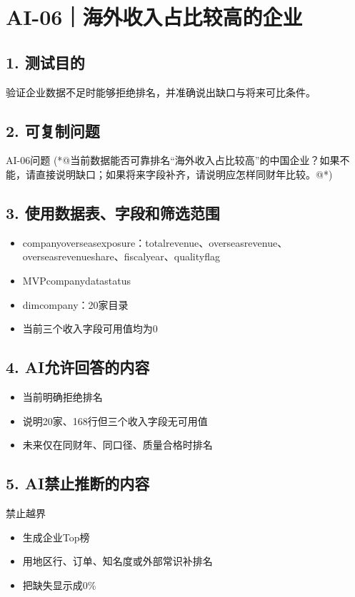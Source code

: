 \documentclass[UTF8,openany,zihao=-4]{ctexbook}
\renewcommand{\_}{\textunderscore\allowbreak}
\begin{document}
\clearpage
\section{AI-06｜海外收入占比较高的企业}
\subsection*{1. 测试目的}
验证企业数据不足时能够拒绝排名，并准确说出缺口与将来可比条件。


\subsection*{2. 可复制问题}
\begin{PromptBox}{AI-06问题}
(*@{\promptcjk 当前数据能否可靠排名“海外收入占比较高”的中国企业？如果不能，请直接说明缺口；如果将来字段补齐，请说明应怎样同财年比较。}@*)
\end{PromptBox}

\subsection*{3. 使用数据表、字段和筛选范围}
\begin{itemize}
\item company\_overseas\_exposure：total\_revenue、overseas\_revenue、overseas\_revenue\_share、fiscal\_year、quality\_flag
\item MVP\_company\_data\_status
\item dim\_company：20家目录
\item 当前三个收入字段可用值均为0
\end{itemize}

\subsection*{4. AI允许回答的内容}
\begin{itemize}
\item 当前明确拒绝排名
\item 说明20家、168行但三个收入字段无可用值
\item 未来仅在同财年、同口径、质量合格时排名
\end{itemize}

\subsection*{5. AI禁止推断的内容}
\begin{dangerbox}{禁止越界}
\begin{itemize}
\item 生成企业Top榜
\item 用地区行、订单、知名度或外部常识补排名
\item 把缺失显示成0\%
\end{itemize}
\end{dangerbox}
\end{document}
